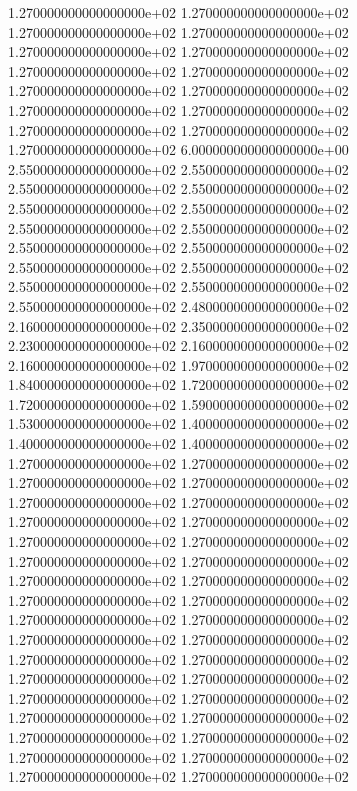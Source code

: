 1.270000000000000000e+02 1.270000000000000000e+02 1.270000000000000000e+02 1.270000000000000000e+02 1.270000000000000000e+02 1.270000000000000000e+02 1.270000000000000000e+02 1.270000000000000000e+02 1.270000000000000000e+02 1.270000000000000000e+02 1.270000000000000000e+02 1.270000000000000000e+02 1.270000000000000000e+02 1.270000000000000000e+02 1.270000000000000000e+02 6.000000000000000000e+00 2.550000000000000000e+02 2.550000000000000000e+02 2.550000000000000000e+02 2.550000000000000000e+02 2.550000000000000000e+02 2.550000000000000000e+02 2.550000000000000000e+02 2.550000000000000000e+02 2.550000000000000000e+02 2.550000000000000000e+02 2.550000000000000000e+02 2.550000000000000000e+02 2.550000000000000000e+02 2.550000000000000000e+02 2.550000000000000000e+02 2.480000000000000000e+02 2.160000000000000000e+02 2.350000000000000000e+02 2.230000000000000000e+02 2.160000000000000000e+02 2.160000000000000000e+02 1.970000000000000000e+02 1.840000000000000000e+02 1.720000000000000000e+02 1.720000000000000000e+02 1.590000000000000000e+02 1.530000000000000000e+02 1.400000000000000000e+02 1.400000000000000000e+02 1.400000000000000000e+02 1.270000000000000000e+02 1.270000000000000000e+02 1.270000000000000000e+02 1.270000000000000000e+02 1.270000000000000000e+02 1.270000000000000000e+02 1.270000000000000000e+02 1.270000000000000000e+02 1.270000000000000000e+02 1.270000000000000000e+02 1.270000000000000000e+02 1.270000000000000000e+02 1.270000000000000000e+02 1.270000000000000000e+02 1.270000000000000000e+02 1.270000000000000000e+02 1.270000000000000000e+02 1.270000000000000000e+02 1.270000000000000000e+02 1.270000000000000000e+02 1.270000000000000000e+02 1.270000000000000000e+02 1.270000000000000000e+02 1.270000000000000000e+02 1.270000000000000000e+02 1.270000000000000000e+02 1.270000000000000000e+02 1.270000000000000000e+02 1.270000000000000000e+02 1.270000000000000000e+02 1.270000000000000000e+02 1.270000000000000000e+02 1.270000000000000000e+02 1.270000000000000000e+02
